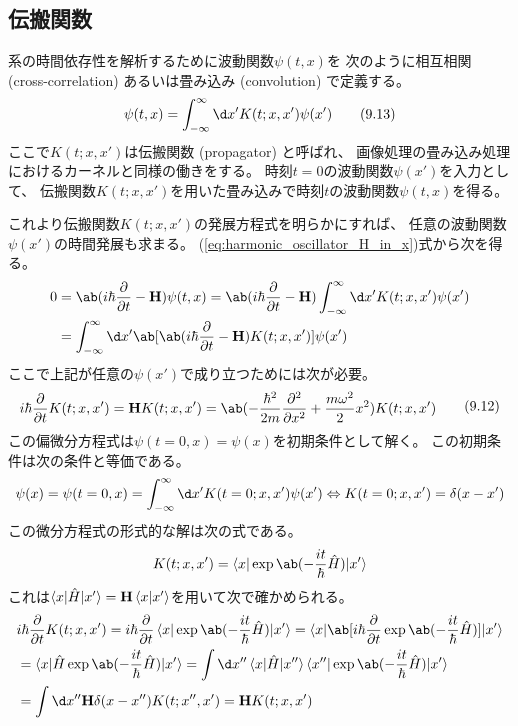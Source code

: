 \subsection{伝搬関数}

系の時間依存性を解析するために波動関数$\psi(t,x)$を
次のように相互相関 (cross-correlation) あるいは畳み込み (convolution) で定義する。
\begin{equation}
  \psi(t,x)
  =\int_{-\infty}^\infty\d x'
  K(t;x,x')\psi(x')
  \tag{9.13}
\end{equation}
ここで$K(t;x,x')$は伝搬関数 (propagator) と呼ばれ、
画像処理の畳み込み処理におけるカーネルと同様の働きをする。
時刻$t=0$の波動関数$\psi(x')$を入力として、
伝搬関数$K(t;x,x')$を用いた畳み込みで時刻$t$の波動関数$\psi(t,x)$を得る。

これより伝搬関数$K(t;x,x')$の発展方程式を明らかにすれば、
任意の波動関数$\psi(x')$の時間発展も求まる。
(\ref{eq:harmonic_oscillator_H_in_x})式から次を得る。
\begin{equation}
  \begin{split}
    0&=\ab(i\hbar\pdv{}{t}-\vb{H})\psi(t,x)
    =\ab(i\hbar\pdv{}{t}-\vb{H})
    \int_{-\infty}^\infty\d x' K(t;x,x')\psi(x') \\
    &=\int_{-\infty}^\infty\d x'
    \ab[\ab(i\hbar\pdv{}{t}-\vb{H})K(t;x,x')]\psi(x') \\
  \end{split}
\end{equation}
ここで上記が任意の$\psi(x')$で成り立つためには次が必要。
\begin{equation}
  \label{eq:propagator_evolution}
  \begin{split}
    i\hbar\pdv{}{t}K(t;x,x')
    =\vb{H}K(t;x,x')
    =\ab(-\frac{\hbar^2}{2m}\pdv[order={2}]{}{x}+\frac{m\omega^2}{2}x^2)K(t;x,x')
  \end{split}
  \tag{9.12}
\end{equation}
この偏微分方程式は$\psi(t=0,x)=\psi(x)$を初期条件として解く。
この初期条件は次の条件と等価である。
\begin{equation}
  \psi(x)=\psi(t=0,x)
  =\int_{-\infty}^\infty\d x'
  K(t=0;x,x')\psi(x')
  \Leftrightarrow
  K(t=0;x,x')=\delta(x-x')
\end{equation}
この微分方程式の形式的な解は次の式である。
\begin{equation}
  K(t;x,x')=\braket{x|\exp \ab(-\frac{it}{\hbar}\hat{H})|x'}
\end{equation}
これは$\braket{x|\hat{H}|x'}=\vb{H}\braket{x|x'}$を用いて次で確かめられる。
\begin{equation}
  \begin{split}
    &i\hbar\pdv{}{t}K(t;x,x')
    =i\hbar\pdv{}{t}\braket{x|\exp \ab(-\frac{it}{\hbar}\hat{H})|x'}
    =\braket{x|\ab[i\hbar\pdv{}{t}\exp \ab(-\frac{it}{\hbar}\hat{H})]|x'} \\
    &=\braket{x|\hat{H}\exp \ab(-\frac{it}{\hbar}\hat{H})|x'}
    =\int\d x''\braket{x|\hat{H}|x''}\braket{x''|\exp \ab(-\frac{it}{\hbar}\hat{H})|x'} \\
    &=\int\d x''\vb{H}\delta(x-x'')K(t;x'',x')
    =\vb{H}K(t;x,x')
  \end{split}
\end{equation}
